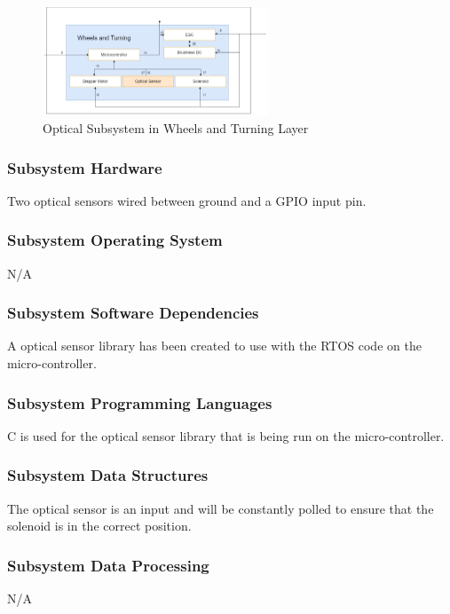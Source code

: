 \begin{figure}[h!]
	\centering
 	\includegraphics[width=0.60\textwidth]{images/Keaton/optical.png}
 \caption{Optical Subsystem in Wheels and Turning Layer}
\end{figure}

\subsubsection{Subsystem Hardware}
Two optical sensors wired between ground and a GPIO input pin.

\subsubsection{Subsystem Operating System}
N/A

\subsubsection{Subsystem Software Dependencies}
A optical sensor library has been created to use with the RTOS code on the micro-controller.

\subsubsection{Subsystem Programming Languages}
C is used for the optical sensor library that is being run on the micro-controller.

\subsubsection{Subsystem Data Structures}
The optical sensor is an input and will be constantly polled to ensure that the solenoid is in the correct position.

\subsubsection{Subsystem Data Processing}
N/A
